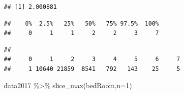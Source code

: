 \documentclass[
]{article}
\newenvironment{Shaded}{\begin{snugshade}}{\end{snugshade}}
\newcommand{\AttributeTok}[1]{\textcolor[rgb]{0.77,0.63,0.00}{#1}}
\newcommand{\CommentTok}[1]{\textcolor[rgb]{0.56,0.35,0.01}{\textit{#1}}}
\newcommand{\DecValTok}[1]{\textcolor[rgb]{0.00,0.00,0.81}{#1}}
\newcommand{\FloatTok}[1]{\textcolor[rgb]{0.00,0.00,0.81}{#1}}
\newcommand{\FunctionTok}[1]{\textcolor[rgb]{0.00,0.00,0.00}{#1}}
\newcommand{\NormalTok}[1]{#1}
\newcommand{\SpecialCharTok}[1]{\textcolor[rgb]{0.00,0.00,0.00}{#1}}
\begin{document}
\begin{Shaded}
\end{Shaded}

\begin{verbatim}
## [1] 2.000881
\end{verbatim}

\begin{Shaded}
\end{Shaded}

\begin{verbatim}
##    0%  2.5%   25%   50%   75% 97.5%  100% 
##     0     1     1     2     2     3     7
\end{verbatim}

\begin{Shaded}
\end{Shaded}

\begin{verbatim}
## 
##     0     1     2     3     4     5     6     7 
##     1 10640 21859  8541   792   143    25     5
\end{verbatim}

\begin{Shaded}
\begin{Highlighting}[]
\NormalTok{data2017 }\SpecialCharTok{\%\textgreater{}\%}
  \FunctionTok{slice\_max}\NormalTok{(bedRoom,}\AttributeTok{n=}\DecValTok{1}\NormalTok{) }
\end{Highlighting}
\end{Shaded}
\end{document}
